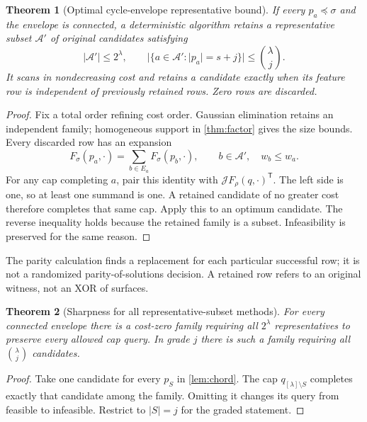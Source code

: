 \documentclass[11pt,a4paper]{article}
\newtheorem{theorem}{Theorem}[section]
\theoremstyle{definition}
\theoremstyle{remark}
\begin{document}
\begin{theorem}[Optimal cycle-envelope representative bound]\label{thm:weighted}
If every $p_a\preceq\sigma$ and the envelope is connected, a deterministic algorithm
retains a representative subset $\mathcal A'$ of original candidates satisfying
\begin{equation}
 |\mathcal A'|\le2^\lambda,\qquad
 |\{a\in\mathcal A':|p_a|=s+j\}|\le\binom\lambda j.
 \label{eq:weightedbound}
\end{equation}
It scans in nondecreasing cost and retains a candidate exactly when its feature row is
independent of previously retained rows. Zero rows are discarded.
\end{theorem}
\begin{proof}
Fix a total order refining cost order. Gaussian elimination retains an independent
family; homogeneous support in \cref{thm:factor} gives the size bounds. Every discarded
row has an expansion
\begin{equation}
 F_\sigma(p_a,\cdot)=\sum_{b\in E_a}F_\sigma(p_b,\cdot),\qquad
 b\in\mathcal A',\quad w_b\le w_a.
 \label{eq:expansion}
\end{equation}
For any cap completing $a$, pair this identity with
$\mathcal JF_\rho(q,\cdot)^{\mathsf T}$. The left side is one, so at least one summand
is one. A retained candidate of no greater cost therefore completes that same cap.
Apply this to an optimum candidate. The reverse inequality holds because the retained
family is a subset. Infeasibility is preserved for the same reason.
\end{proof}

The parity calculation finds a replacement for each particular successful row; it is
not a randomized parity-of-solutions decision. A retained row refers to an original
witness, not an XOR of surfaces.

\begin{theorem}[Sharpness for all representative-subset methods]\label{thm:lower}
For every connected envelope there is a cost-zero family requiring all $2^\lambda$
representatives to preserve every allowed cap query. In grade $j$ there is such a family
requiring all $\binom\lambda j$ candidates.
\end{theorem}
\begin{proof}
Take one candidate for every $p_S$ in \cref{lem:chord}. The cap
$q_{[\lambda]\setminus S}$ completes exactly that candidate among the family.
Omitting it changes its query from feasible to infeasible. Restrict to $|S|=j$ for
the graded statement.
\end{proof}
\end{document}
